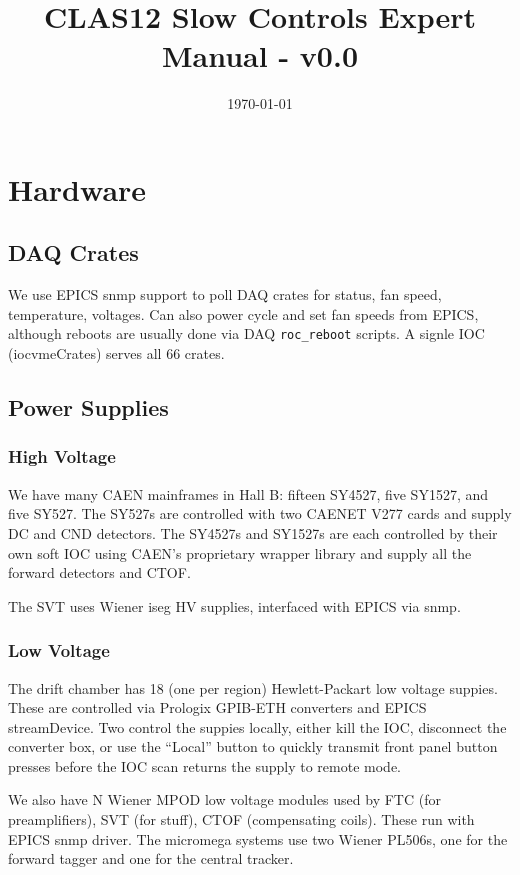 \documentclass[amsmath,amssymb,notitlepage,11pt]{revtex4}
\begin{document}
\title{CLAS12 Slow Controls Expert Manual - v0.0}
\date{\today}
\begin{abstract}
\end{abstract}

\maketitle
\tableofcontents
\newpage

\section{Hardware}
\subsection{DAQ Crates}
We use EPICS snmp support to poll DAQ crates for status, fan speed, temperature, voltages.  Can also power cycle and set fan speeds from EPICS, although reboots are usually done via DAQ \texttt{roc\_reboot} scripts.  A signle IOC (iocvmeCrates) serves all 66 crates. 

\subsection{Power Supplies}
\subsubsection{High Voltage}
We have many CAEN mainframes in Hall B: fifteen SY4527, five SY1527, and five SY527.  The SY527s are controlled with two CAENET V277 cards and supply DC and CND detectors.  The SY4527s and SY1527s are each controlled by their own soft IOC using CAEN's proprietary wrapper library and supply all the forward detectors and CTOF.  

The SVT uses Wiener iseg HV supplies, interfaced with EPICS via snmp.

\subsubsection{Low Voltage}
The drift chamber has 18 (one per region) Hewlett-Packart low voltage suppies.  These are controlled via Prologix GPIB-ETH converters and EPICS streamDevice.  Two control the suppies locally, either kill the IOC, disconnect the converter box, or use the ``Local'' button to quickly transmit front panel button presses before the IOC scan returns the supply to remote mode.

We also have N Wiener MPOD low voltage modules used by FTC (for preamplifiers), SVT (for stuff), CTOF (compensating coils).  These run with EPICS snmp driver.  The micromega systems use two Wiener PL506s, one for the forward tagger and one for the central tracker.
\end{document}

